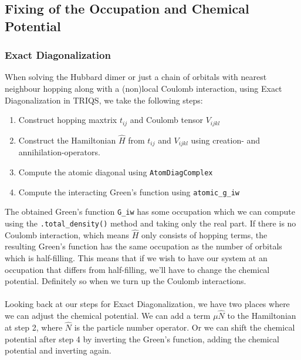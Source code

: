 \documentclass[12pt]{article}
\begin{document}
\noindent
\subsection*{Fixing of the Occupation and Chemical Potential}
\subsubsection*{Exact Diagonalization}
When solving the Hubbard dimer or just a chain of orbitals with nearest neighbour hopping along with a (non)local Coulomb interaction, using Exact Diagonalization in TRIQS, we take the following steps:
\begin{enumerate}
	\item Construct hopping maxtrix $t_{ij}$ and Coulomb tensor $V_{ijkl}$
	\item Construct the Hamiltonian $\hat{H}$ from $t_{ij}$ and $V_{ijkl}$ using creation- and annihilation-operators.
	\item Compute the atomic diagonal using \texttt{AtomDiagComplex}
	\item Compute the interacting Green's function using \texttt{atomic\_g\_iw}
\end{enumerate}
The obtained Green's function \texttt{G\_iw} has some occupation which we can compute using the \texttt{.total\_density()} method and taking only the real part. If there is no Coulomb interaction, which means $\hat{H}$ only consists of hopping terms, the resulting Green's function has the same occupation as the number of orbitals which is half-filling. This means that if we wish to have our system at an occupation that differs from half-filling, we'll have to change the chemical potential. Definitely so when we turn up the Coulomb interactions.\\
\\
Looking back at our steps for Exact Diagonalization, we have two places where we can adjust the chemical potential. We can add a term $\mu \hat{N}$ to the Hamiltonian at step 2, where $\hat{N}$ is the particle number operator. Or we can shift the chemical potential after step 4 by inverting the Green's function, adding the chemical potential and inverting again.
\end{document}
